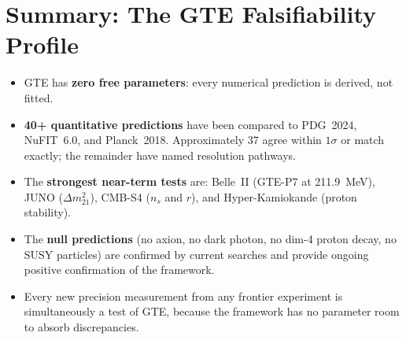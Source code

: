 \documentclass[11pt,a4paper]{article}
\begin{document}
\section{Summary: The GTE Falsifiability Profile}
\label{sec:summary}

\begin{tcolorbox}[colback=boxblue,colframe=blue!40!black,
  title=Key facts about GTE falsifiability, breakable]
\begin{itemize}[itemsep=4pt]
  \item GTE has \textbf{zero free parameters}: every numerical prediction is
    derived, not fitted.

  \item \textbf{40+ quantitative predictions} have been compared to PDG~2024,
    NuFIT~6.0, and Planck~2018.  Approximately 37 agree within $1\sigma$ or
    match exactly; the remainder have named resolution pathways.

  \item The \textbf{strongest near-term tests} are:
    Belle~II (GTE-P7 at 211.9~MeV), JUNO ($\Delta m^2_{21}$), CMB-S4 ($n_s$
    and $r$), and Hyper-Kamiokande (proton stability).

  \item The \textbf{null predictions} (no axion, no dark photon, no dim-4
    proton decay, no SUSY particles) are confirmed by current searches and
    provide ongoing positive confirmation of the framework.

  \item Every new precision measurement from any frontier experiment is
    simultaneously a test of GTE, because the framework has no parameter room to
    absorb discrepancies.
\end{itemize}
\end{tcolorbox}
\end{document}
